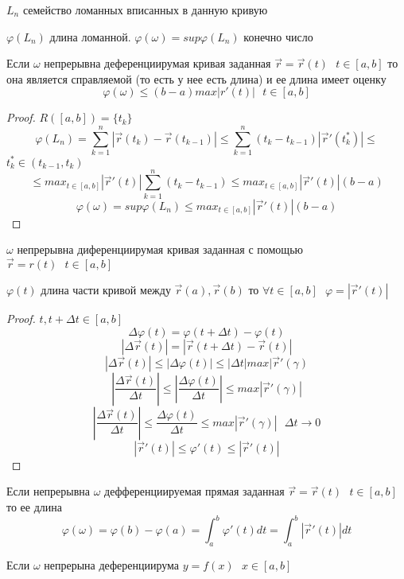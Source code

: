 $L_n$ семейство ломанных вписанных в данную кривую

$\varphi (L_n)$ длина ломанной. $\varphi (\omega) = sup \varphi (L_n)$ конечно
число

\begin{theorem}
  Если $\omega$ непрерывна деференциирумая кривая заданная
  $\vec r = \vec r (t) ~~~ t \in [a,b]$ то она является справляемой
  (то есть у нее есть длина) и ее длина имеет оценку
  $$
  \varphi (\omega) \le (b-a) max |r'(t)| ~~~ t \in [a,b]
  $$
\end{theorem}

\begin{proof}
  $
  R([a,b]) = \{t_k\}
  $
  $$
  \varphi (L_n) = \sum_{k=1}^n |\vec r (t_k) - \vec r (t_{k-1})| \le
  \sum_{k=1}^n (t_k - t_{k-1}) |\vec r' (t_k^*)| \le
  $$
  $t_k^* \in (t_{k-1}, t_k)$
  $$
  \le max_{t \in [a,b]} |\vec r' (t)| \sum_{k=1}^n (t_k - t_{k-1}) \le
  max_{t \in [a,b]} |\vec r' (t)| (b-a)
  $$
  $$
  \varphi (\omega) = sup \varphi (L_n) \le max_{t \in [a,b]} |\vec r' (t)|(b-a)
  $$
\end{proof}

\begin{theorem}
  $\omega$  непрерывна диференциирумая кривая заданная с помощью
  $\vec r = r(t) ~~~ t \in [a,b]$

  $\varphi (t)$ длина части кривой между $\vec r(a), \vec r(b)$ то
  $\forall t \in [a,b] ~~~ \varphi = |\vec r'(t)|$
\end{theorem}

\begin{proof}
  $t, t+\Delta t \in [a,b]$
  $$
  \Delta \varphi (t) = \varphi( t+\Delta t) - \varphi(t)
  $$
  $$
  |\Delta \vec r(t) | = |\vec r(t+\Delta t) - \vec r(t)|
  $$
  $$
  |\Delta \vec r(t)| \le |\Delta \varphi (t)| \le
  |\Delta t| max | \vec r'(\gamma)
  $$
  $$
  \left| \frac{\Delta \vec r(t)}{\Delta t} \right| \le
  \left| \frac{\Delta \varphi (t)}{\Delta t} \right| \le
  max |\vec r'(\gamma)|
  $$
  $$
  \left| \frac{\Delta \vec r(t)}{\Delta t} \right| \le
  \frac{\Delta \varphi (t)}{\Delta t} \le
  max |\vec r'(\gamma)| ~~~ \Delta t \to 0
  $$
  $$
  |\vec r'(t)| \le \varphi'(t) \le |\vec r'(t)|
  $$
\end{proof}

  Если непрерывна $\omega$ дефференциируемая прямая заданная
  $\vec r = \vec r (t) ~~~ t \in [a,b]$ то ее длина
  $$
  \varphi (\omega) = \varphi(b) - \varphi(a) = \int_a^b \varphi' (t) dt =
  \int_a^b | \vec r'(t) | dt
  $$

  Если $\omega$ непрерына деференциирума $y = f(x) ~~~ x \in [a,b]$

